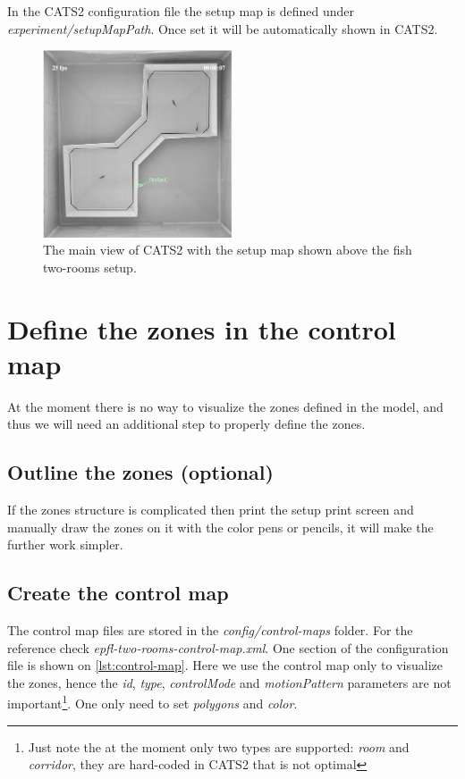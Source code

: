 \documentclass{styles/assisi}
\begin{document}
In the CATS2 configuration file the setup map is defined under {\it experiment/setupMapPath}. 
Once set it will be automatically shown in CATS2. 

\begin{figure}[ht]
\centering
\includegraphics[width=0.5\textwidth]{./figs/setup-map.png}
\caption{The main view of CATS2 with the setup map shown above the fish two-rooms setup.}
\label{fig:setup-map}
\end{figure}

\section{Define the zones in the control map}
At the moment there is no way to visualize the zones defined in the model, and thus we will need an additional step to properly define the zones. 

\subsection{Outline the zones (optional)}
If the zones structure is complicated then print the setup print screen and manually draw the zones on it with the color pens or pencils, it will make the further work simpler.

\subsection{Create the control map}
The control map files are stored in the {\it config/control-maps} folder. For the reference check {\it epfl-two-rooms-control-map.xml}. One section of the configuration file is shown on \ref{lst:control-map}. Here we use the control map only to visualize the zones, hence the {\it id}, {\it type}, {\it controlMode} and {\it motionPattern} parameters are not important\footnote{Just note the at the moment only two types are supported: {\it room} and {\it corridor}, they are hard-coded in CATS2 that is not optimal}. One only need to set {\it polygons} and {\it color}.
\end{document}
